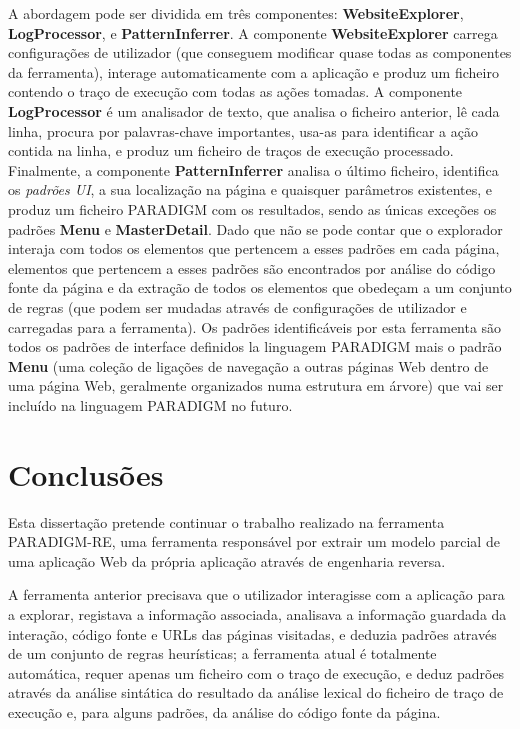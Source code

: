 \documentclass[9pt,a4paper]{extarticle}
\begin{document}
\begin{multicols}{2}
A abordagem pode ser dividida em três componentes: \textbf{WebsiteExplorer}, \textbf{LogProcessor}, e \textbf{PatternInferrer}.
A componente \textbf{WebsiteExplorer} carrega configurações de utilizador (que conseguem modificar quase todas as componentes da ferramenta), interage automaticamente com a aplicação e produz um ficheiro contendo o traço de execução com todas as ações tomadas. A componente \textbf{LogProcessor} é um analisador de texto, que analisa o ficheiro anterior, lê cada linha, procura por palavras-chave importantes, usa-as para identificar a ação contida na linha, e produz um ficheiro de traços de execução processado. Finalmente, a componente \textbf{PatternInferrer} analisa o último ficheiro, identifica os \textit{padrões UI}, a sua localização na página e quaisquer parâmetros existentes, e produz um ficheiro PARADIGM com os resultados, sendo as únicas exceções os padrões \textbf{Menu} e \textbf{MasterDetail}. Dado que não se pode contar que o explorador interaja com todos os elementos que pertencem a esses padrões em cada página, elementos que pertencem a esses padrões são encontrados por análise do código fonte da página e da extração de todos os elementos que obedeçam a um conjunto de regras (que podem ser mudadas através de configurações de utilizador e carregadas para a ferramenta). Os padrões identificáveis por esta ferramenta são todos os padrões de interface definidos la linguagem PARADIGM mais o padrão \textbf{Menu} (uma coleção de ligações de navegação a outras páginas Web dentro de uma página Web, geralmente organizados numa estrutura em árvore) que vai ser incluído na linguagem PARADIGM no futuro.

\section{Conclusões}\label{sec:conclui}
Esta dissertação pretende continuar o trabalho realizado na ferramenta PARADIGM-RE, uma ferramenta responsável por extrair um modelo parcial de uma aplicação Web da própria aplicação através de engenharia reversa.

A ferramenta anterior precisava que o utilizador interagisse com a aplicação para a explorar, registava a informação associada, analisava a informação guardada da interação, código fonte e URLs das páginas visitadas, e deduzia padrões através de um conjunto de regras heurísticas; a ferramenta atual é totalmente automática, requer apenas um ficheiro com o traço de execução, e deduz padrões através da análise sintática do resultado da análise lexical do ficheiro de traço de execução e, para alguns padrões, da análise do código fonte da página.



\end{multicols}
\end{document}
